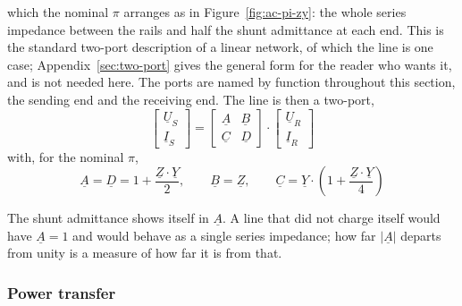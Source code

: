 which the nominal $\pi$ arranges as in Figure~\ref{fig:ac-pi-zy}: the whole
series impedance between the rails and half the shunt admittance at each
end. This is the standard two-port description of a linear network, of which
the line is one case; Appendix~\ref{sec:two-port} gives the general form for
the reader who wants it, and is not needed here. The ports are named by
function throughout this section, the sending end and the receiving end. The
line is then a two-port,
\begin{equation}
  \begin{bmatrix} \underline{U}_S \\ \underline{I}_S \end{bmatrix}
  =
  \begin{bmatrix} \underline{A} & \underline{B} \\
                  \underline{C} & \underline{D} \end{bmatrix}
  \cdot
  \begin{bmatrix} \underline{U}_R \\ \underline{I}_R \end{bmatrix}
  \label{eq:ac-abcd}
\end{equation}
with, for the nominal $\pi$,
\begin{equation}
  \underline{A} = \underline{D} = 1 + \frac{\underline{Z} \cdot \underline{Y}}{2},
  \qquad
  \underline{B} = \underline{Z},
  \qquad
  \underline{C} = \underline{Y} \cdot
      \left(1 + \frac{\underline{Z} \cdot \underline{Y}}{4}\right)
  \label{eq:ac-abcd-pi}
\end{equation}

The shunt admittance shows itself in $\underline{A}$. A line that did not
charge itself would have $\underline{A} = 1$ and would behave as a single
series impedance; how far $\left|\underline{A}\right|$ departs from unity is
a measure of how far it is from that.

\subsubsection{Power transfer}
\label{sec:ac-power-transfer}

